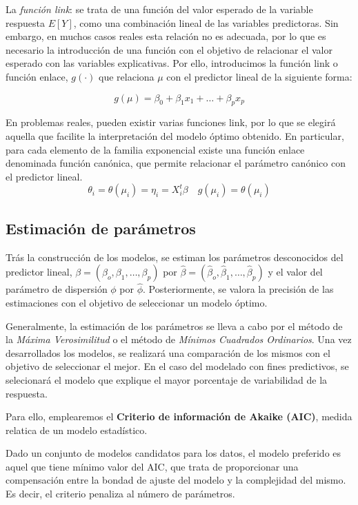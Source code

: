 \documentclass[12pt,a4paper,]{book}
\numberwithin{dummy}{section}
\theoremstyle{ocrenumbox}
\theoremstyle{blacknumex}
\theoremstyle{blacknumbox}
\theoremstyle{ocrenum}
\theoremstyle{ocrenum}
\begin{document}
La \emph{función link}: se trata de una función del valor esperado de la
variable respuesta \(E[Y]\), como una combinación lineal de las
variables predictoras. Sin embargo, en muchos casos reales esta relación
no es adecuada, por lo que es necesario la introducción de una función
con el objetivo de relacionar el valor esperado con las variables
explicativas. Por ello, introducimos la función link o función enlace,
\(g(\cdot)\) que relaciona \(\mu\) con el predictor lineal de la
siguiente forma:

\[
g(\mu)=\beta_0 + \beta_1x_1+ \dots + \beta_px_p
\]

En problemas reales, pueden existir varias funciones link, por lo que se
elegirá aquella que facilite la interpretación del modelo óptimo
obtenido. En particular, para cada elemento de la familia exponencial
existe una función enlace denominada función canónica, que permite
relacionar el parámetro canónico con el predictor lineal. \[
\theta_i = \theta(\mu_i) = \eta_i =  X^t_i\beta \quad g(\mu_i)=\theta(\mu_i)
\]

\hypertarget{estimaciuxf3n-de-paruxe1metros}{%
\subsection{Estimación de
parámetros}\label{estimaciuxf3n-de-paruxe1metros}}

Trás la construcción de los modelos, se estiman los parámetros
desconocidos del predictor lineal,
\(\beta=(\beta_o,\beta_1,\dots,\beta_p)\) por
\(\hat\beta=(\hat\beta_o,\hat\beta_1,\dots,\hat\beta_p)\) y el valor del
parámetro de dispersión \(\phi\) por \(\hat\phi\). Posteriormente, se
valora la precisión de las estimaciones con el objetivo de seleccionar
un modelo óptimo.

Generalmente, la estimación de los parámetros se lleva a cabo por el
método de la \emph{Máxima Verosimilitud} o el método de \emph{Mínimos
Cuadrados Ordinarios}. Una vez desarrollados los modelos, se realizará
una comparación de los mismos con el objetivo de seleccionar el mejor.
En el caso del modelado con fines predictivos, se selecionará el modelo
que explique el mayor porcentaje de variabilidad de la respuesta.

Para ello, emplearemos el \textbf{Criterio de información de Akaike
(AIC)}, medida relatica de un modelo estadístico.

Dado un conjunto de modelos candidatos para los datos, el modelo
preferido es aquel que tiene mínimo valor del AIC, que trata de
proporcionar una compensación entre la bondad de ajuste del modelo y la
complejidad del mismo. Es decir, el criterio penaliza al número de
parámetros.
\end{document}
